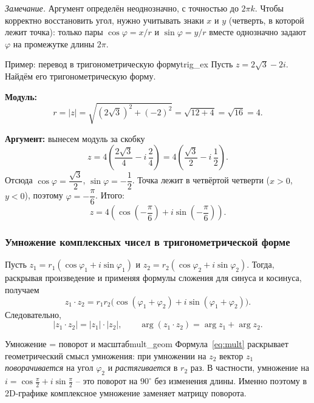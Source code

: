 \documentclass[12pt,a4paper]{article}
\begin{document}
\textit{Замечание.} Аргумент определён неоднозначно, с точностью до
$2\pi k$. Чтобы корректно восстановить угол, нужно учитывать знаки
$x$ и $y$ (четверть, в которой лежит точка): только пары
$\cos\varphi = x/r$ и $\sin\varphi = y/r$ вместе однозначно задают
$\varphi$ на промежутке длины $2\pi$.

\begin{definition}{Пример: перевод в тригонометрическую форму}{trig_ex}
  Пусть $z = 2\sqrt{3} - 2i$. Найдём его тригонометрическую форму.

  \textbf{Модуль:}
  \[
    r = |z| = \sqrt{\left(2\sqrt{3}\right)^2 + (-2)^2}
    = \sqrt{12 + 4} = \sqrt{16} = 4.
  \]

  \textbf{Аргумент:} вынесем модуль за скобку
  \[
    z = 4\!\left(\frac{2\sqrt{3}}{4} - i\,\frac{2}{4}\right)
    = 4\!\left(\frac{\sqrt{3}}{2} - i\,\frac{1}{2}\right).
  \]
  Отсюда $\cos\varphi = \dfrac{\sqrt{3}}{2}$,
  $\sin\varphi = -\dfrac{1}{2}$. Точка лежит в четвёртой четверти
  ($x > 0$, $y < 0$), поэтому $\varphi = -\dfrac{\pi}{6}$. Итого:
  \[
    z = 4\!\left(\cos\!\left(-\frac{\pi}{6}\right)
    + i\sin\!\left(-\frac{\pi}{6}\right)\right).
  \]
\end{definition}

\subsubsection*{Умножение комплексных чисел в тригонометрической форме}

Пусть $z_1 = r_1(\cos\varphi_1 + i\sin\varphi_1)$ и
$z_2 = r_2(\cos\varphi_2 + i\sin\varphi_2)$. Тогда, раскрывая
произведение и применяя формулы сложения для синуса и косинуса,
получаем
\begin{equation}
  z_1 \cdot z_2 = r_1 r_2\bigl(\cos(\varphi_1 + \varphi_2)
  + i\sin(\varphi_1 + \varphi_2)\bigr).
  \tag{12.1}
  \label{eq:mult}
\end{equation}
Следовательно,
\[
  |z_1 \cdot z_2| = |z_1| \cdot |z_2|, \qquad
  \arg(z_1 \cdot z_2) = \arg z_1 + \arg z_2.
\]

\begin{remarkIT}{Умножение = поворот и масштаб}{mult_geom}
  Формула~\eqref{eq:mult} раскрывает геометрический смысл умножения:
  при умножении на $z_2$ вектор $z_1$ \emph{поворачивается} на угол
  $\varphi_2$ и \emph{растягивается} в $r_2$ раз. В частности,
  умножение на $i = \cos\frac{\pi}{2} + i\sin\frac{\pi}{2}$ -- это
  поворот на $90^\circ$ без изменения длины. Именно поэтому в 2D-графике
  комплексное умножение заменяет матрицу поворота.
\end{remarkIT}
\end{document}
